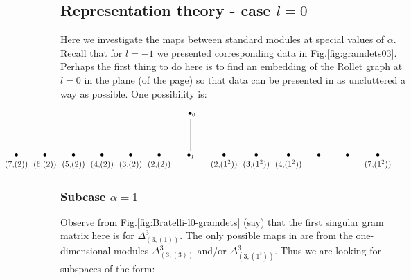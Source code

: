 
\subsection{Representation theory - case $l=0$}

Here we investigate the maps between standard modules at special values of $\alpha$. 
Recall that for $l=-1$ we presented corresponding data in Fig.\ref{fig:gramdets03}.
Perhaps the first thing to do here is to find an embedding of the Rollet graph at $l=0$ in the plane (of the page) so that data can be presented in as uncluttered a way as possible. One possibility is:
\newcommand{\ver}[1]{{\!\!\!\!\!\!\begin{array}{c} { } \\ \bullet \\ \!\!\!\! \scriptsize{#1} \!\!\!\! \end{array}\!\!\!\!\!\!}}
\[
\hspace{-2.1cm} 
\xymatrix{
   &&&&&& \;\bullet_0 \ar@{-}[d] \\
\ver{(7,\!(2))} \ar@{-}[r] & 
\ver{(6,\!(2))} \ar@{-}[r] & 
\ver{(5,\!(2))} \ar@{-}[r] & 
\ver{(4,\!(2))} \ar@{-}[r] & 
\ver{(3,\!(2))} \ar@{-}[r] & 
\ver{(2,\!(2))} \ar@{-}[r] & 
\bullet_1 \ar@{-}[r] & 
\ver{(2,\!(1^2))} \ar@{-}[r] & 
\ver{(3,\!(1^2))} \ar@{-}[r] & 
\ver{(4,\!(1^2))} \ar@{-}[r] & 
\bullet \ar@{-}[r] & 
\bullet \ar@{-}[r] & 
\ver{(7,\!(1^2))} & 
}
\]



\subsubsection{Subcase $\alpha =1$}  \label{ss:alph1}

Observe from Fig.\ref{fig:Bratelli-l0-gramdets} (say) that 
the first singular gram matrix here is for  $\Delta^{3}_{(3,(1))}$. 
The only possible maps in are from the one-dimensional modules 
$\Delta^{3}_{(3,(3))}$ and/or $\Delta^{3}_{(3,(1^3))}$. 
Thus we are looking for subspaces of the form:

\newcommand{\IU}{
\raisebox{-.32cm}{
\begin{tikzpicture}
     \draw (0,0) -- (2,0) ;
     \draw (.5,0) -- (.5,-1);
     \draw (1,0) .. controls (1,-.5) and (1.5,-.5) .. (1.5,0) ;
     \draw (1,-1) .. controls (1,-.5) and (1.5,-.5) .. (1.5,-1) ;
 \draw (0,-1) -- (2,-1);
 \end{tikzpicture}
}}
\newcommand{\UI}{
\raisebox{-.32cm}{
\begin{tikzpicture}
     \draw (0,0) -- (2,0) ;
     \draw (1.5,0) -- (1.5,-1);
     \draw (.5,0) .. controls (.5,-.5) and (1,-.5) .. (1,0) ;
     \draw (.5,-1) .. controls (.5,-.5) and (1,-.5) .. (1,-1) ;
 \draw (0,-1) -- (2,-1);
 \end{tikzpicture}
}}
\newcommand{\SigI}{
\raisebox{-.32cm}{
\begin{tikzpicture}
     \draw (0,0) -- (2,0) ;
     \draw (1.5,0) -- (1.5,-1);
     \draw (.5,0) -- (1,-1) ;
     \draw (.5,-1) -- (1,0) ;
 \draw (0,-1) -- (2,-1);
 \end{tikzpicture}
}}

